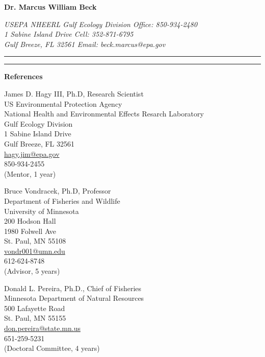 \documentclass[letterpaper,12pt]{article}
\newcommand{\sectitle}[1]{\vspace{\baselineskip} \centerline{\large{{\bf #1}}}}
\begin{document}
\LARGE
\centerline{{\bf Dr. Marcus William Beck}}
\normalsize
\textit{USEPA NHEERL Gulf Ecology Division \hfill Office: 850-934-2480 \\
1 Sabine Island Drive \hfill Cell: 352-871-6795 \\
Gulf Breeze, FL 32561 \hfill Email: beck.marcus@epa.gov}
\vspace{4pt}
\hrule
\vspace{2pt}
\hrule
\vspace{4pt}


\sectitle{References}

\centering
James D. Hagy III, Ph.D, Research Scientist  \\ 
US Environmental Protection Agency \\
National Health and Environmental Effects Resarch Laboratory \\
Gulf Ecology Division \\
1 Sabine Island Drive \\
Gulf Breeze, FL 32561 \\
\href{mailto:hagy.jim@epa.gov}{hagy.jim@epa.gov} \\
850-934-2455 \\
(Mentor, 1 year) \\
\vspace{\baselineskip}

Bruce Vondracek, Ph.D, Professor \\ 
Department of Fisheries and Wildlife \\
University of Minnesota \\
200 Hodson Hall \\
1980 Folwell Ave \\
St. Paul, MN 55108 \\
\href{mailto:vondr001@umn.edu}{vondr001@umn.edu} \\
612-624-8748 \\
(Advisor, 5 years) \\
\vspace{\baselineskip}

Donald L. Pereira, Ph.D., Chief of Fisheries \\
Minnesota Department of Natural Resources \\
500 Lafayette Road \\
St. Paul, MN 55155 \\
\href{mailto:don.pereira@state.mn.us}{don.pereira@state.mn.us} \\
651-259-5231 \\
(Doctoral Committee, 4 years) \\
\end{document}
